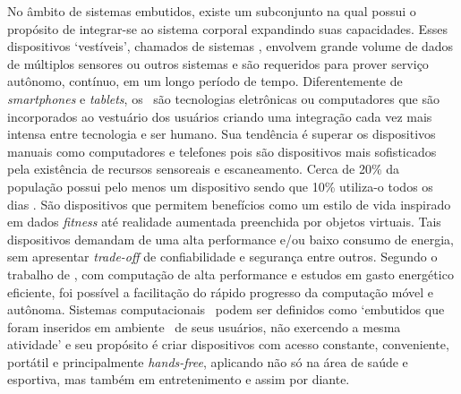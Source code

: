 	No âmbito de sistemas embutidos, existe um subconjunto na qual possui o propósito de integrar-se ao sistema corporal expandindo suas capacidades. 
	Esses dispositivos `vestíveis', chamados de sistemas \wearables, envolvem grande volume de dados de múltiplos sensores ou outros sistemas e são requeridos para prover serviço autônomo, contínuo, em um longo período de tempo.
   Diferentemente de \textit{smartphones} e \textit{tablets}, os \wearables\ são tecnologias eletrônicas ou computadores que são incorporados ao vestuário dos usuários criando uma integração cada vez mais intensa entre tecnologia e ser humano. 
   Sua tendência é superar os dispositivos manuais como computadores e telefones pois são dispositivos mais sofisticados pela existência de recursos sensoreais e escaneamento.
   Cerca de 20\% da população possui pelo menos um dispositivo sendo que 10\% utiliza-o todos os dias \citep{lee2016information}.
   São dispositivos que permitem benefícios como um estilo de vida inspirado em dados \textit{fitness} até realidade aumentada preenchida por objetos virtuais.
	Tais dispositivos demandam de uma alta performance e/ou baixo consumo de energia, sem apresentar \textit{trade-off} de confiabilidade e segurança entre outros. %
	Segundo o trabalho de \citet{Jozwiak2017}, com computação de alta performance e estudos em gasto energético eficiente, foi possível a facilitação do rápido progresso da computação móvel e autônoma.
	Sistemas computacionais \wearables\ podem ser definidos como `embutidos que foram inseridos em ambiente \mobile\ de seus usuários, não exercendo a mesma atividade' e seu propósito é criar dispositivos com acesso constante, conveniente, portátil e principalmente \textit{hands-free}, aplicando não só na área de saúde e esportiva, mas também em entretenimento e assim por diante.

